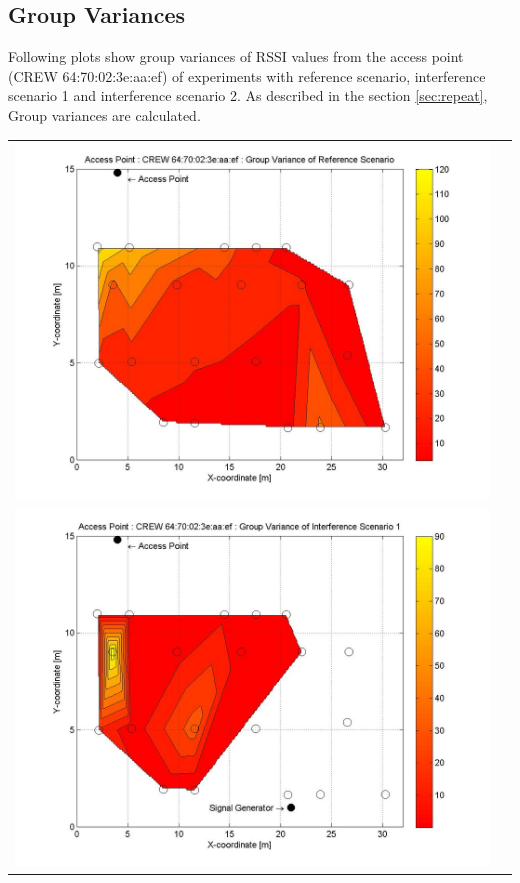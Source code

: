 \documentclass[11pt,a4paper,headinclude,footinclude,chapterprefix=on]{scrreprt}
\begin{document}
\subsection{Group Variances} 
Following plots show group variances of RSSI values from the access point (CREW 64:70:02:3e:aa:ef) of experiments with reference scenario, interference scenario 1 and interference scenario 2. As described in the section \ref{sec:repeat}, Group variances are calculated.  
\begin{longtable}
	{lr} 
	\includegraphics[width=13cm]{../../Source/plot/CREW_ef/ef_Ref_Group_Variance.jpg} \\
	\includegraphics[width=13cm]{../../Source/plot/CREW_ef/ef_Sig_Group_Variance.jpg} \\

\end{longtable}
\end{document}
